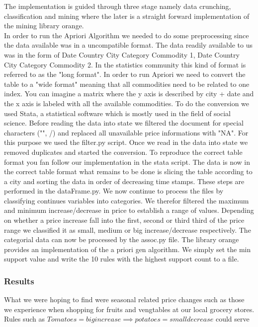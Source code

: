 The implementation is guided through three stage namely data crunching, classification and  mining where the later is a straight forward implementation of the mining library orange. \\



In order to run the Apriori Algorithm we needed to do some preprocessing since the data available was in a uncompatible format. The data readily available to us was in the form 
of Date Country City Category Commodity 1, Date Country City Category Commodity 2. In the statistics community this kind of format is referred to as the "long format". In order to run Apriori we need to convert the table to a "wide format" meaning that all commodities need to be related to one index. You can imagine a matrix where the y axis is described by city + date and the x axis is labeled with all the available commodities. To do the conversion we used Stata, a statistical software which is mostly used in the field of social science. Before reading the data into state we filtered the document for special characters ("", /) and replaced all unavailable price informations with "NA". For this purpose we used the filter.py script. Once we read in the data into state we removed duplicates and started the conversion. To reproduce the correct table format you fan follow our implementation in the stata script.  The data is now in the correct table format what remains to be done is slicing the table according to a city and sorting the data in order of decreasing time stamps. These steps are performed in the dataFrame.py. We now continue to process the files by classifying continues variables into categories. We therefor filtered the maximum and minimum increase/decrease in price to establish a range of values. Depending on whether a price increase fall into the first, second or third third of the price range we classified it as small, medium or big increase/decrease respectively. The categorial data can now be processed by the assoc.py file. The library orange provides an implementation of the a priori gen algorithm. We simply set the min support value and write the 10 rules with the highest support count to a file. 

\subsubsection{Results}

What we were hoping to find were seasonal related price changes such as those we experience when shopping for fruits and vengtables at our local grocery stores. Rules such as $Tomatoes = big increase \implies potatoes = small decrease$ could serve 


